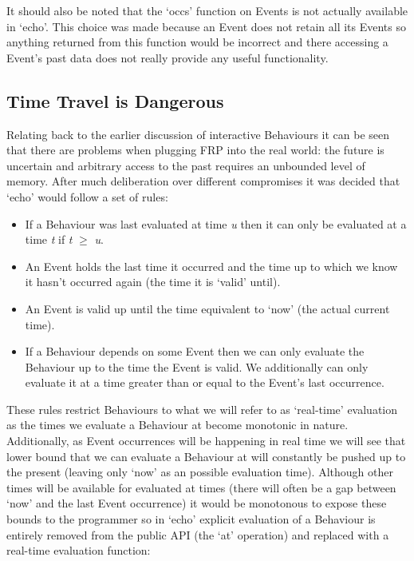       It should also be noted that the `occs' function on Events is not actually available in `echo'. This
      choice was made because an Event does not retain all its Events so anything returned from this 
      function would be incorrect and there accessing a Event's past data does not really
      provide any useful functionality.

    \subsection{Time Travel is Dangerous}
      Relating back to the earlier discussion of interactive Behaviours it can be seen
      that there are problems when plugging FRP into the real world: the future is uncertain and
      arbitrary access to the past requires an unbounded level of memory. After much deliberation
      over different compromises it was decided that `echo' would follow a set of rules:
      
      \begin{itemize}
        \item If a Behaviour was last evaluated at time \emph{u} then it can only be evaluated at
        a time \emph{t} if \emph{t} $\geq$ \emph{u}.
        \item An Event holds the last time it occurred and the time up to which we know it hasn't occurred
        again (the time it is `valid' until).
        \item An Event is valid up until the time equivalent to `now' (the actual current time).
        \item If a Behaviour depends on some Event then we can only evaluate the Behaviour up to
        the time the Event is valid. We additionally can only evaluate it at a time greater than
        or equal to the Event's last occurrence.
      \end{itemize}
      
      These rules restrict Behaviours to what we will refer to as `real-time' evaluation as the times
      we evaluate a Behaviour at become monotonic in nature. Additionally, as Event occurrences will
      be happening in real time we will see that lower bound that we can evaluate a Behaviour at will
      constantly be pushed up to the present (leaving only `now' as an possible evaluation time). Although
      other times will be available for evaluated at times (there will often be a gap between `now' and
      the last Event occurrence) it would be monotonous to expose these bounds to the programmer so
      in `echo' explicit evaluation of a Behaviour is entirely removed from the public API (the
      `at' operation) and replaced with a real-time evaluation function:

